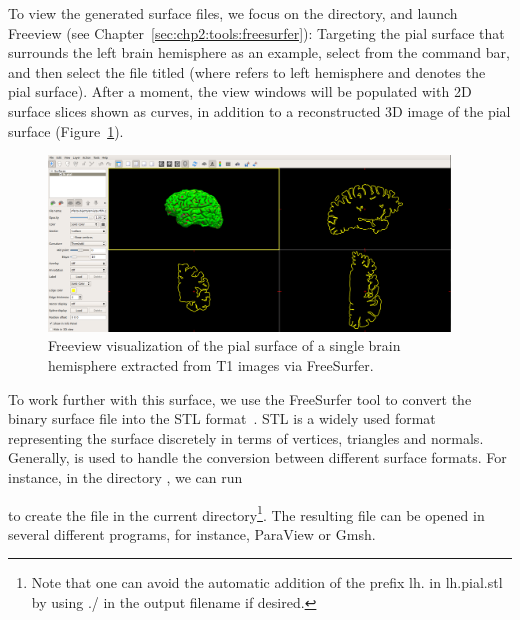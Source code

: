 %
%
To view the generated surface files, we focus on the 
directory, and launch Freeview (see
Chapter~\ref{sec:chp2:tools:freesurfer}):
\noindent Targeting the pial surface that surrounds the left brain
hemisphere as an example, select 
from the command bar, and then select the file titled 
(where  refers to left hemisphere and  denotes the pial
surface). After a moment, the view windows will be populated with 2D
surface slices shown as curves, in addition to a reconstructed 3D
image of the pial surface (Figure~\ref{fig:chp3:freeview-scr}).
\begin{figure}%
  \centering
  \includegraphics[width=0.95\textwidth]{./graphics/chp3/freeviewexscr}
  \caption{Freeview visualization of the pial surface of a single
    brain hemisphere extracted from T1 images via FreeSurfer.}
  \label{fig:chp3:freeview-scr}
\end{figure}

%
%
To work further with this surface, we use the FreeSurfer tool
 to convert the binary surface file into the STL
format~\cite{roscoe1988stereolithography}. STL is a widely used format
representing the surface discretely in terms of vertices, triangles
and normals. Generally,  is used to handle the
conversion between different surface formats. For instance, in the
directory , we can run


\noindent to create the file  in the current
directory\footnote{Note that one can avoid 
the automatic addition of the prefix lh. in lh.pial.stl by using ./ in the 
output filename if desired.}. The resulting file can be opened in several 
different programs, for instance, ParaView or Gmsh.

